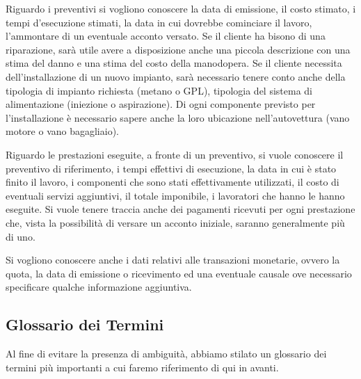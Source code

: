 		Riguardo i preventivi si vogliono conoscere la data di emissione, il costo stimato, i tempi d’esecuzione stimati, la data in cui dovrebbe cominciare il lavoro, l’ammontare di un eventuale acconto versato. Se il cliente ha bisono di una riparazione, sarà utile avere a disposizione anche una piccola descrizione con una stima del danno e una stima del costo della manodopera. Se il cliente necessita dell’installazione di un nuovo impianto, sarà necessario tenere conto anche della tipologia di impianto richiesta (metano o GPL), tipologia del sistema di alimentazione (iniezione o aspirazione). Di ogni componente previsto per l’installazione è necessario sapere anche la loro ubicazione nell’autovettura (vano motore o vano bagagliaio). 
		
		Riguardo le prestazioni eseguite, a fronte di un preventivo, si vuole conoscere il preventivo di riferimento, i tempi effettivi di esecuzione, la data in cui è stato finito il lavoro, i componenti che sono stati effettivamente utilizzati, il costo di eventuali servizi aggiuntivi, il totale imponibile, i lavoratori che hanno le hanno eseguite. Si vuole tenere traccia anche dei pagamenti ricevuti per ogni prestazione che, vista la possibilità di versare un acconto iniziale, saranno generalmente più di uno. 
		
		Si vogliono conoscere anche i dati relativi alle transazioni monetarie, ovvero la quota, la data di emissione o ricevimento ed una eventuale causale ove necessario specificare qualche informazione aggiuntiva.
		
	\subsection{Glossario dei Termini}
	
		Al fine di evitare la presenza di ambiguità, abbiamo stilato un glossario dei termini più importanti a cui faremo riferimento di qui in avanti.
	
						
